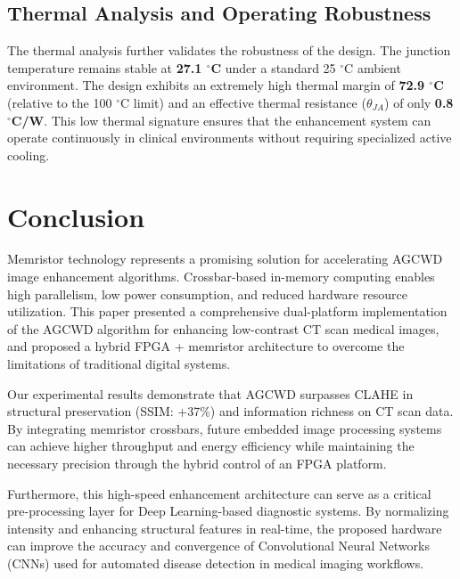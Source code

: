 \documentclass[conference]{IEEEtran}
\begin{document}
\subsection{Thermal Analysis and Operating Robustness}
The thermal analysis further validates the robustness of the design. The junction temperature remains stable at \textbf{27.1 $^\circ$C} under a standard 25 $^\circ$C ambient environment. The design exhibits an extremely high thermal margin of \textbf{72.9 $^\circ$C} (relative to the 100 $^\circ$C limit) and an effective thermal resistance ($\theta_{JA}$) of only \textbf{0.8 $^\circ$C/W}. This low thermal signature ensures that the enhancement system can operate continuously in clinical environments without requiring specialized active cooling.

\section{Conclusion}
\label{sec:conclusion}

Memristor technology represents a promising solution for accelerating AGCWD image enhancement algorithms. Crossbar-based in-memory computing enables high parallelism, low power consumption, and reduced hardware resource utilization. This paper presented a comprehensive dual-platform implementation of the AGCWD algorithm for enhancing low-contrast CT scan medical images, and proposed a hybrid FPGA + memristor architecture to overcome the limitations of traditional digital systems.

Our experimental results demonstrate that AGCWD surpasses CLAHE in structural preservation (SSIM: +37\%) and information richness on CT scan data. By integrating memristor crossbars, future embedded image processing systems can achieve higher throughput and energy efficiency while maintaining the necessary precision through the hybrid control of an FPGA platform. 

Furthermore, this high-speed enhancement architecture can serve as a critical pre-processing layer for Deep Learning-based diagnostic systems. By normalizing intensity and enhancing structural features in real-time, the proposed hardware can improve the accuracy and convergence of Convolutional Neural Networks (CNNs) used for automated disease detection in medical imaging workflows.
\end{document}
